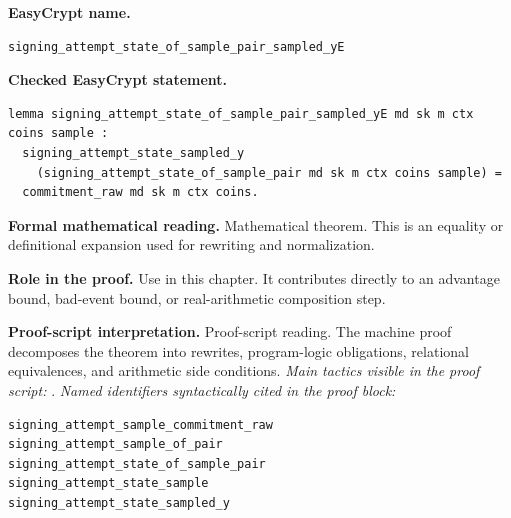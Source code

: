 \begin{formaltheorem}
\noindent\textbf{EasyCrypt name.}
\begin{lstlisting}[language=EasyCrypt,basicstyle=\ttfamily\scriptsize]
signing_attempt_state_of_sample_pair_sampled_yE
\end{lstlisting}
\noindent\textbf{Checked EasyCrypt statement.}
\begin{lstlisting}[language=EasyCrypt,basicstyle=\ttfamily\scriptsize]
lemma signing_attempt_state_of_sample_pair_sampled_yE md sk m ctx coins sample :
  signing_attempt_state_sampled_y
    (signing_attempt_state_of_sample_pair md sk m ctx coins sample) =
  commitment_raw md sk m ctx coins.
\end{lstlisting}
\noindent\textbf{Formal mathematical reading.}
Mathematical theorem. This is an equality or definitional expansion used for rewriting and normalization.

\noindent\textbf{Role in the proof.}
Use in this chapter. It contributes directly to an advantage bound, bad-event bound, or real-arithmetic composition step.

\noindent\textbf{Proof-script interpretation.}
Proof-script reading. The machine proof decomposes the theorem into rewrites, program-logic obligations, relational equivalences, and arithmetic side conditions.
\emph{Main tactics visible in the proof script:} .
\emph{Named identifiers syntactically cited in the proof block:}
\begin{lstlisting}[language=EasyCrypt,basicstyle=\ttfamily\scriptsize]
signing_attempt_sample_commitment_raw
signing_attempt_sample_of_pair
signing_attempt_state_of_sample_pair
signing_attempt_state_sample
signing_attempt_state_sampled_y
\end{lstlisting}

\end{formaltheorem}

